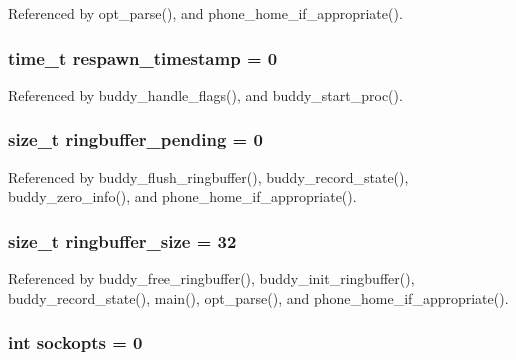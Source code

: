 Referenced by opt\_\-parse(), and phone\_\-home\_\-if\_\-appropriate().

\subsubsection[{respawn\_\-timestamp}]{\setlength{\rightskip}{0pt plus 5cm}time\_\-t {\bf respawn\_\-timestamp} = 0\hspace{0.3cm}{\ttfamily  [static]}}\label{buddy_8c_a585a8d637b449525b158a160771fb4b1}


Referenced by buddy\_\-handle\_\-flags(), and buddy\_\-start\_\-proc().

\subsubsection[{ringbuffer\_\-pending}]{\setlength{\rightskip}{0pt plus 5cm}size\_\-t {\bf ringbuffer\_\-pending} = 0\hspace{0.3cm}{\ttfamily  [static]}}\label{buddy_8c_af9029329735214e89a6493415ea518d8}


Referenced by buddy\_\-flush\_\-ringbuffer(), buddy\_\-record\_\-state(), buddy\_\-zero\_\-info(), and phone\_\-home\_\-if\_\-appropriate().

\subsubsection[{ringbuffer\_\-size}]{\setlength{\rightskip}{0pt plus 5cm}size\_\-t {\bf ringbuffer\_\-size} = 32}\label{buddy_8c_aaf0b4e8526897974d594cc330ece0b5c}


Referenced by buddy\_\-free\_\-ringbuffer(), buddy\_\-init\_\-ringbuffer(), buddy\_\-record\_\-state(), main(), opt\_\-parse(), and phone\_\-home\_\-if\_\-appropriate().

\subsubsection[{sockopts}]{\setlength{\rightskip}{0pt plus 5cm}int {\bf sockopts} = 0\hspace{0.3cm}{\ttfamily  [static]}}\label{buddy_8c_a96887378de19e365e512e218277030e4}


